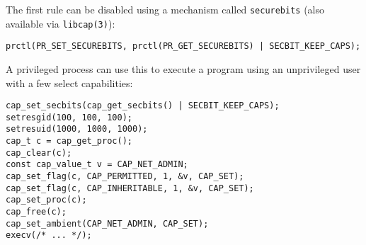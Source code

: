 The first rule can be disabled using a mechanism called \texttt{securebits}
(also available via \texttt{libcap(3)})\footnotemark:


\begin{lstlisting}[style=c]
prctl(PR_SET_SECUREBITS, prctl(PR_GET_SECUREBITS) | SECBIT_KEEP_CAPS);
\end{lstlisting}

A privileged process can use this to execute a program using an unprivileged
user with a few select capabilities:

\begin{lstlisting}[style=c]
cap_set_secbits(cap_get_secbits() | SECBIT_KEEP_CAPS);
setresgid(100, 100, 100);
setresuid(1000, 1000, 1000);
cap_t c = cap_get_proc();
cap_clear(c);
const cap_value_t v = CAP_NET_ADMIN;
cap_set_flag(c, CAP_PERMITTED, 1, &v, CAP_SET);
cap_set_flag(c, CAP_INHERITABLE, 1, &v, CAP_SET);
cap_set_proc(c);
cap_free(c);
cap_set_ambient(CAP_NET_ADMIN, CAP_SET);
execv(/* ... */);
\end{lstlisting}
